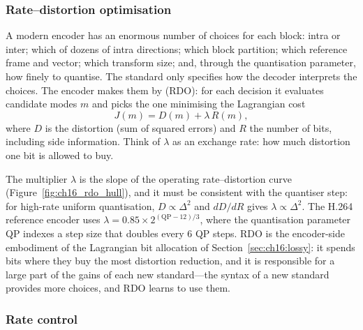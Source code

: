 \subsubsection{Rate--distortion optimisation}

A modern encoder has an enormous number of choices for each block: intra or inter; which of dozens of
intra directions; which block partition; which reference frame and vector; which transform size; and,
through the quantisation parameter, how finely to quantise. The standard only specifies how the decoder
interprets the choices. The encoder makes them by  (RDO): for each
decision it evaluates candidate modes $m$ and picks the one minimising the Lagrangian cost
\begin{equation}
J(m)=D(m)+\lambda\,R(m),
\label{eq:ch16:rdo}
\end{equation}
where $D$ is the distortion (sum of squared errors) and $R$ the number of bits, including side
information. Think of $\lambda$ as an exchange rate: how much distortion one bit is allowed to buy.


The multiplier $\lambda$ is the slope of the operating rate--distortion curve
(Figure~\ref{fig:ch16_rdo_hull}), and it must be consistent with the quantiser step: for high-rate
uniform quantisation, $D\propto\Delta^2$ and $dD/dR$ gives $\lambda\propto\Delta^2$. The H.264
reference encoder uses $\lambda=0.85\times2^{(\mathrm{QP}-12)/3}$, where the quantisation parameter
QP indexes a step size that doubles every 6 QP steps. RDO is the encoder-side embodiment of the
Lagrangian bit allocation of Section~\ref{sec:ch16:lossy}: it spends bits where they buy the most
distortion reduction, and it is responsible for a large part of the gains of each new standard---the
syntax of a new standard provides more choices, and RDO learns to use them.

\subsubsection{Rate control}

